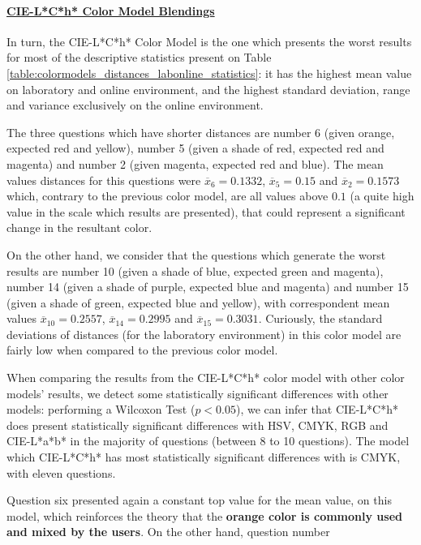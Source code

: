 \paragraph{\ul{CIE-L*C*h* Color Model Blendings}} \par
\label{par:lchcolormodel}
%
In turn, the CIE-L*C*h* Color Model is the one which presents the worst results for most of the descriptive statistics present on Table \ref{table:colormodels_distances_labonline_statistics}: it has the highest
mean value on laboratory and online environment, and the highest standard deviation, range and variance exclusively on the online environment. \par
%
The three questions which have shorter distances are number 6 (given orange, expected red and yellow), number 5 (given a shade of red, expected red and magenta) and number 2 (given magenta, expected red
and blue). The mean values distances for this questions were $\overline{x}_{6} = 0.1332$, $\overline{x}_{5} = 0.15$ and $\overline{x}_{2} = 0.1573$ which, contrary to the previous color model, are all values above $0.1$ (a quite
high value in the scale which results are presented), that could represent a significant change in the resultant color. \par
%
On the other hand, we consider that the questions which generate the worst results are number 10 (given a shade of blue, expected green and magenta), number 14 (given a shade of purple, expected blue and magenta) and number
15 (given a shade of green, expected blue and yellow), with correspondent mean values $\overline{x}_{10} = 0.2557$, $\overline{x}_{14} = 0.2995$ and $\overline{x}_{15} = 0.3031$. Curiously, the standard deviations of distances (for the
laboratory environment) in this color model are fairly low when compared to the previous color model. \par
%
When comparing the results from the CIE-L*C*h* color model with other color models' results, we detect some statistically significant differences with other models: performing a Wilcoxon Test ($p < 0.05$), we can infer that CIE-L*C*h* does
present statistically significant differences with HSV, CMYK, RGB and CIE-L*a*b* in the majority of questions (between 8 to 10 questions). The model which CIE-L*C*h* has most statistically significant differences with is CMYK, with eleven questions. \par
%
Question six presented again a constant top value for the mean value, on this model, which reinforces the theory that the \textbf{orange color is commonly used and mixed by the users}. On the other hand, question number
